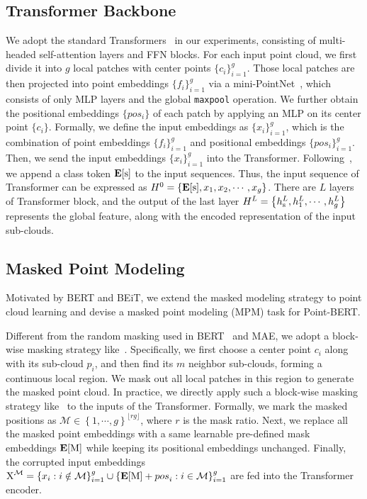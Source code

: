 \subsection{Transformer Backbone}
We adopt the standard Transformers~\cite{vaswani2017attention} in our experiments, consisting of multi-headed self-attention layers and FFN blocks. For each input point cloud, we first divide  it into $g$ local patches with center points $\{c_i\}_{i=1}^g$.  Those local patches are then projected into point embeddings $\{f_i\}_{i=1}^g$  via a mini-PointNet~\cite{pointnet}, which consists of only MLP layers and the global \texttt{maxpool} operation. We further obtain the positional embeddings $\{pos_i\}$ of each patch by applying  an MLP  on its  center point $\{c_i\}$.  Formally, we define the input embeddings as $\{x_i\}_{i=1}^g$, which is the combination of point embeddings $\{f_i\}_{i=1}^g$ and positional embeddings $\{pos_i\}_{i=1}^g$. Then, we send the input embeddings  $\{x_i\}_{i=1}^g$ into the Transformer. Following~\cite{bert}, we append a class token $\mathbf{E}[\textup{s}]$ to the input sequences. Thus, the input sequence of Transformer can be expressed as $ H^{0}=\left \{ \mathbf{E}[\textup{s}],  x_{1},  x_{2}, \cdots ,  x_{g} \right \}$. There are $L$ layers of Transformer block, and the output of the last layer $ H^{L}= \left \{  h_{\textup{s}}^{L},  h_{1}^{L}, \cdots ,  h_{g}^{L}\right \}$ represents the global feature, along with the encoded representation of the input sub-clouds. 

\subsection{Masked Point Modeling}

Motivated by BERT\cite{bert} and BEiT\cite{beit}, we extend the masked modeling strategy to point cloud learning and devise a masked point modeling (MPM) task for Point-BERT. 			

  Different from the random masking used in  BERT~\cite{bert} and MAE\cite{mae}, we adopt a block-wise masking strategy like~\cite{beit}. Specifically, we first choose a center point $c_{i}$ along with its sub-cloud $p_{i}$, and then find its $m$ neighbor sub-clouds, forming a continuous local region. We mask out all local patches in this region to generate the masked point cloud.  In practice, we directly apply such a block-wise masking strategy like~\cite{beit} to the inputs of the Transformer.  Formally, we mark the masked positions as $\mathcal{M}\in \left \{ 1,\cdots ,g \right \}^{\lfloor rg  \rfloor}$, where $r$ is the mask ratio. Next, we replace all the masked point embeddings with a same learnable pre-defined mask embeddings $\mathbf{E}[\textup{M}]$ while keeping its positional embeddings unchanged. Finally, the corrupted input embeddings $
\textup{X}^{\mathcal{M}}=\left \{   x_{i}: i\notin \mathcal{M}   \right \}_{i=1}^{g}   \cup  \left \{ \mathbf{E}[\textup{M}] + {pos}_i :i\in  \mathcal{M} \right \}_{i=1}^{g} $ are fed into the Transformer encoder.

